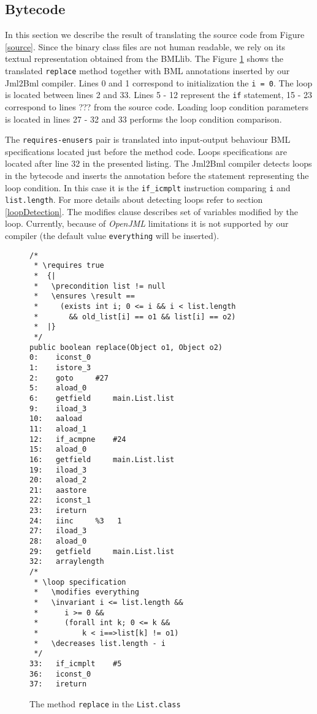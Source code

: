 \documentclass{acm_proc_article-sp}
\begin{document}
\subsection{Bytecode}
In this section we describe the result of translating the source code from Figure \ref{source}. Since the binary class files are not human readable, we rely on its textual representation obtained from the BMLlib. The Figure \ref{bytecode} shows the translated \texttt{replace} method together with BML annotations inserted by our Jml2Bml compiler. Lines 0 and 1 correspond to initialization the \texttt{i = 0}. The loop is located between lines 2 and 33. Lines 5 - 12 represent the \texttt{if} statement, 15 - 23 correspond to lines ??? from the source code. Loading loop condition parameters is located in lines 27 - 32 and 33 performs the loop condition comparison.

The \texttt{requires-enusers} pair is translated into input-output behaviour BML specifications located just before the method code. Loops specifications are located after line 32 in the presented listing. The Jml2Bml compiler detects loops in the bytecode and inserts the annotation before the statement representing the loop condition. In this case it is the \texttt{if\_icmplt} instruction comparing \texttt{i} and \texttt{list.length}. For more details about detecting loops refer to section \ref{loopDetection}. The modifies clause describes set of variables modified by the loop. Currently, because of \textit{OpenJML} limitations it is not supported by our compiler (the default value \texttt{everything} will be inserted).
\begin{figure}
\lstset{basicstyle=\small}

\begin{lstlisting}
/*
 * \requires true
 *  {|
 *   \precondition list != null
 *   \ensures \result ==
 *     (exists int i; 0 <= i && i < list.length
 *       && old_list[i] == o1 && list[i] == o2)
 *  |}
 */
public boolean replace(Object o1, Object o2)
0:    iconst_0
1:    istore_3
2:    goto	   #27
5:    aload_0
6:    getfield	   main.List.list
9:    iload_3
10:   aaload
11:   aload_1
12:   if_acmpne	   #24
15:   aload_0
16:   getfield	   main.List.list
19:   iload_3
20:   aload_2
21:   aastore
22:   iconst_1
23:   ireturn
24:   iinc	   %3	1
27:   iload_3
28:   aload_0
29:   getfield	   main.List.list
32:   arraylength
/*
 * \loop specification
 *   \modifies everything
 *   \invariant i <= list.length &&
 *      i >= 0 &&
 *      (forall int k; 0 <= k &&
 *          k < i==>list[k] != o1)
 *   \decreases list.length - i
 */
33:   if_icmplt	   #5
36:   iconst_0
37:   ireturn

\end{lstlisting}
\label{bytecode}
\caption{The method \texttt{replace} in the \texttt{List.class}}
\end{figure}
\end{document}
